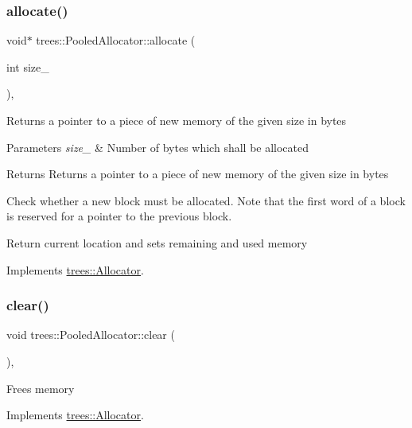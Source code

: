 \subsubsection{\texorpdfstring{allocate()}{allocate()}}
{\footnotesize\ttfamily void$\ast$ trees\+::\+Pooled\+Allocator\+::allocate (\begin{DoxyParamCaption}\item[{int}]{size\+\_\+ }\end{DoxyParamCaption})\hspace{0.3cm}{\ttfamily [inline]}, {\ttfamily [virtual]}}

Returns a pointer to a piece of new memory of the given size in bytes


\begin{DoxyParams}{Parameters}
{\em size\+\_\+} & Number of bytes which shall be allocated \\
\hline
\end{DoxyParams}
\begin{DoxyReturn}{Returns}
Returns a pointer to a piece of new memory of the given size in bytes 
\end{DoxyReturn}
Check whether a new block must be allocated. Note that the first word of a block is reserved for a pointer to the previous block.

Return current location and sets remaining and used memory

Implements \hyperlink{classtrees_1_1_allocator_a3963a4c0384e3a83fd258a7d6b5303b9}{trees\+::\+Allocator}.

\mbox{\label{classtrees_1_1_pooled_allocator_aeaf5da95ab275fed2865de00801e79b2}} 
\subsubsection{\texorpdfstring{clear()}{clear()}}
{\footnotesize\ttfamily void trees\+::\+Pooled\+Allocator\+::clear (\begin{DoxyParamCaption}{ }\end{DoxyParamCaption})\hspace{0.3cm}{\ttfamily [inline]}, {\ttfamily [virtual]}}

Frees memory 

Implements \hyperlink{classtrees_1_1_allocator_aa1188b27061817113bc4a3e4523868e0}{trees\+::\+Allocator}.

